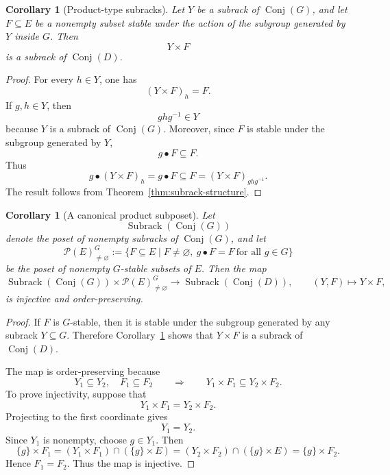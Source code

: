 \documentclass[11pt]{article}
\theoremstyle{plain}
\newtheorem{corollary}[theorem]{Corollary}
\theoremstyle{definition}
\theoremstyle{remark}
\DeclareMathOperator{\Conj}{Conj}
\begin{document}
	\begin{corollary}[Product-type subracks]\label{cor:product-subracks}
		Let \(Y\) be a subrack of \(\Conj(G)\), and let \(F\subseteq E\) be a
		nonempty subset stable under the action of the subgroup generated by \(Y\)
		inside \(G\). Then
		\[
		Y\times F
		\]
		is a subrack of \(\Conj(D)\).
	\end{corollary}
	
	\begin{proof}
		For every \(h\in Y\), one has
		\[
		(Y\times F)_h=F.
		\]
		If \(g,h\in Y\), then
		\[
		ghg^{-1}\in Y
		\]
		because \(Y\) is a subrack of \(\Conj(G)\). Moreover, since \(F\) is stable
		under the subgroup generated by \(Y\),
		\[
		g\bullet F\subseteq F.
		\]
		Thus
		\[
		g\bullet(Y\times F)_h
		=
		g\bullet F
		\subseteq
		F
		=
		(Y\times F)_{ghg^{-1}}.
		\]
		The result follows from Theorem~\ref{thm:subrack-structure}.
	\end{proof}
	
	\begin{corollary}[A canonical product subposet]\label{cor:product-sublattice}
		Let
		\[
		\operatorname{Subrack}(\Conj(G))
		\]
		denote the poset of nonempty subracks of \(\Conj(G)\), and let
		\[
		\mathcal P(E)^G_{\neq\varnothing}
		:=
		\{F\subseteq E\mid F\neq\varnothing,\ g\bullet F=F\ \text{for all }g\in G\}
		\]
		be the poset of nonempty \(G\)-stable subsets of \(E\). Then the map
		\[
		\operatorname{Subrack}(\Conj(G))
		\times
		\mathcal P(E)^G_{\neq\varnothing}
		\longrightarrow
		\operatorname{Subrack}(\Conj(D)),
		\qquad
		(Y,F)\longmapsto Y\times F,
		\]
		is injective and order-preserving.
	\end{corollary}
	
	\begin{proof}
		If \(F\) is \(G\)-stable, then it is stable under the subgroup generated by
		any subrack \(Y\subseteq G\). Therefore
		Corollary~\ref{cor:product-subracks} shows that \(Y\times F\) is a subrack
		of \(\Conj(D)\).
		
		The map is order-preserving because
		\[
		Y_1\subseteq Y_2,\quad F_1\subseteq F_2
		\qquad\Longrightarrow\qquad
		Y_1\times F_1\subseteq Y_2\times F_2.
		\]
		To prove injectivity, suppose that
		\[
		Y_1\times F_1=Y_2\times F_2.
		\]
		Projecting to the first coordinate gives
		\[
		Y_1=Y_2.
		\]
		Since \(Y_1\) is nonempty, choose \(g\in Y_1\). Then
		\[
		\{g\}\times F_1
		=
		(Y_1\times F_1)\cap(\{g\}\times E)
		=
		(Y_2\times F_2)\cap(\{g\}\times E)
		=
		\{g\}\times F_2.
		\]
		Hence \(F_1=F_2\). Thus the map is injective.
	\end{proof}
	
\end{document}
